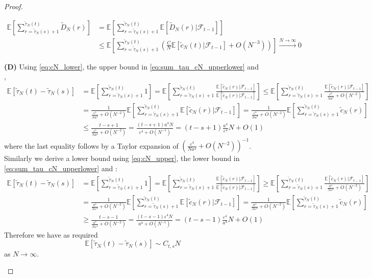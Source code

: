 \documentclass[fleqn]{article}
\theoremstyle{definition}
\newcommand{\E}{\mathbb{E}}
\newcommand{\Ntoinfty}{\overset{N\to\infty}{\longrightarrow}}
\newcommand{\F}{\mathcal{F}_{t-1}}
\begin{document}
\begin{proof}
\begin{description}
\begin{align*}
\E\left[ \sum_{r=\tilde{\tau}_N(s)+1}^{\tilde{\tau}_N(t)} \tilde{D}_N(r) \right]
&= \E\left[ \sum_{r=\tilde{\tau}_N(s)+1}^{\tilde{\tau}_N(t)} \E[\tilde{D}_N(r) |\F] \right] \\
&\leq  \E\left[ \sum_{r=\tilde{\tau}_N(s)+1}^{\tilde{\tau}_N(t)} \left( \frac{C}{N}\E[\tilde{c}_N(t) |\F] + O(N^{-3})\right) \right] 
\Ntoinfty 0
\end{align*}
\item{\textbf{(D)}} Using \eqref{eq:cN_lower}, the upper bound in \eqref{eq:sum_tau_cN_upperlower} and \citet[Lemma 2]{koskela2018},
\begin{align*}
\E[\tilde{\tau}_N(t) - \tilde{\tau}_N(s)] 
&= \E\left[ \sum_{r=\tilde{\tau}_N(s)+1}^{\tilde{\tau}_N(t)} 1 \right] 
= \E\left[ \sum_{r=\tilde{\tau}_N(s)+1}^{\tilde{\tau}_N(t)} \frac{\E[\tilde{c}_N(r) |\F]}{\E[\tilde{c}_N(r) |\F]} \right] 
\leq \E\left[ \sum_{r=\tilde{\tau}_N(s)+1}^{\tilde{\tau}_N(t)} \frac{\E[\tilde{c}_N(r) |\F]}{\frac{\varepsilon^4}{Na^4}+O(N^{-2})} \right] \\
&= \frac{1}{\frac{\varepsilon^4}{Na^4}+O(N^{-2})} \E\left[ \sum_{r=\tilde{\tau}_N(s)+1}^{\tilde{\tau}_N(t)} \E[\tilde{c}_N(r) |\F] \right] 
= \frac{1}{\frac{\varepsilon^4}{Na^4}+O(N^{-2})} \E\left[ \sum_{r=\tilde{\tau}_N(s)+1}^{\tilde{\tau}_N(t)} \tilde{c}_N(r) \right] \\
&\leq \frac{t-s+1}{\frac{\varepsilon^4}{Na^4	}+O(N^{-2})} = \frac{(t-s+1)a^4 N}{\varepsilon^4 + O(N^{-1})} 
= (t-s+1)\frac{a^4}{\varepsilon^4}N + O(1)
\end{align*}
where the last equality follows by a Taylor expansion of $(\frac{\varepsilon^4}{Na^4	}+O(N^{-2}))^{-1}$.\\
Similarly we derive a lower bound using \eqref{eq:cN_upper}, the lower bound in \eqref{eq:sum_tau_cN_upperlower} and \citet[Lemma 2]{koskela2018}:
\begin{align*}
\E[\tilde{\tau}_N(t) - \tilde{\tau}_N(s)] 
&= \E\left[ \sum_{r=\tilde{\tau}_N(s)+1}^{\tilde{\tau}_N(t)} 1 \right] 
= \E\left[ \sum_{r=\tilde{\tau}_N(s)+1}^{\tilde{\tau}_N(t)} \frac{\E[\tilde{c}_N(r) |\F]}{\E[\tilde{c}_N(r) |\F]} \right] 
\geq \E\left[ \sum_{r=\tilde{\tau}_N(s)+1}^{\tilde{\tau}_N(t)} \frac{\E[\tilde{c}_N(r) |\F]}{\frac{a^4}{N\varepsilon^4}+O(N^{-2})} \right] \\
&= \frac{1}{\frac{a^4}{N\varepsilon^4}+O(N^{-2})} \E\left[ \sum_{r=\tilde{\tau}_N(s)+1}^{\tilde{\tau}_N(t)} \E[\tilde{c}_N(r) |\F] \right] 
= \frac{1}{\frac{a^4}{N\varepsilon^4}+O(N^{-2})} \E\left[ \sum_{r=\tilde{\tau}_N(s)+1}^{\tilde{\tau}_N(t)} \tilde{c}_N(r) \right] \\
&\geq \frac{t-s-1}{\frac{a^4}{N\varepsilon^4}+O(N^{-2})} = \frac{(t-s-1)\varepsilon^4 N}{a^4 + O(N^{-1})} 
= (t-s-1)\frac{\varepsilon^4}{a^4}N + O(1)
\end{align*}
Therefore we have as required
\begin{equation*}
\E[\tilde{\tau}_N(t) - \tilde{\tau}_N(s)] \sim C_{t,s} N
\end{equation*}
as $N\to\infty$.
\end{description}
\end{proof}
\end{document}

